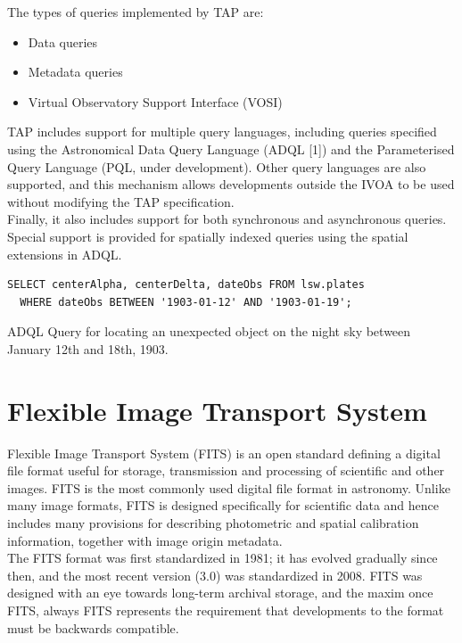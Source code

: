 The types of queries implemented by TAP are:

\begin{itemize}
\item Data queries
\item Metadata queries
\item Virtual Observatory Support Interface (VOSI)
\end{itemize}


TAP includes support for multiple query languages, including queries specified using the Astronomical Data Query Language (ADQL [1]) and the Parameterised Query Language (PQL, under development). Other query languages are also supported, and this mechanism allows developments outside the IVOA to be used without modifying the TAP specification.\\

Finally, it also includes support for both synchronous and asynchronous queries. Special support is provided for spatially indexed queries using the spatial extensions in ADQL.\\


\begin{lstlisting}
SELECT centerAlpha, centerDelta, dateObs FROM lsw.plates
  WHERE dateObs BETWEEN '1903-01-12' AND '1903-01-19'; 
\end{lstlisting}
ADQL Query for locating an unexpected object on the night sky between January 12th and 18th, 1903.


\section{Flexible Image Transport System}
 
Flexible Image Transport System (FITS) is an open standard defining a digital file format useful for storage, transmission and processing of scientific and other images. FITS is the most commonly used digital file format in astronomy. Unlike many image formats, FITS is designed specifically for scientific data and hence includes many provisions for describing photometric and spatial calibration information, together with image origin metadata.\\

The FITS format was first standardized in 1981; it has evolved gradually since then, and the most recent version (3.0) was standardized in 2008. FITS was designed with an eye towards long-term archival storage, and the maxim once FITS, always FITS represents the requirement that developments to the format must be backwards compatible.\\
 
